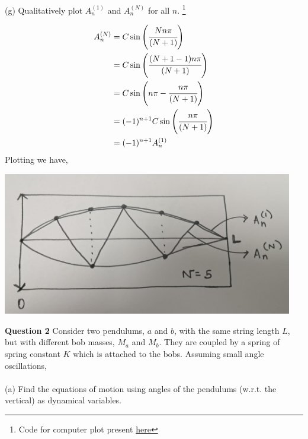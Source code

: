 \documentclass[addpoints]{exam}
\begin{document}
\begin{questions}
\begin{solution}
\end{solution}
\newpage
(g) Qualitatively plot $A^{(1)}_n$ and $A^{(N)}_n$ for all $n$.
    \footnote{Code for computer plot present \href{https://github.com/TheInvisibleFoe/IISER_notes/tree/main/PH2101/assignment02}{here}}
\begin{solution}
     \begin{align*}
         A_{n}^{(N)} &= C \sin\left(\cfrac{Nn\pi}{(N+1)}\right)\\ 
                     &= C \sin\left(\cfrac{(N+1-1)n\pi}{(N+1)}\right)\\
                     &= C \sin\left(n\pi - \cfrac{n\pi}{(N+1)}\right)\\
                     &= (-1)^{n+1}C \sin\left(\cfrac{n\pi}{(N+1)}\right)\\
                     &= (-1)^{n+1}A_n^{(1)}
    \end{align*}
    Plotting we have,
    \begin{center}
        \includegraphics[width = 5.0in]{q1g.jpeg}
    \end{center}
\end{solution}
\newpage
\question\textbf{Question 2}
Consider two pendulums, $a$ and $b$, with the same string length $L$, but with different bob masses, $M_a$ and $M_b$. They are coupled by a spring of spring constant $K$ which 
is attached to the bobs. Assuming small angle oscillations, \\ \\ 
(a) Find the equations of motion using angles of the pendulums (w.r.t. the vertical) as dynamical variables.
\begin{solution}
    \begin{center}
        


\begin{tikzpicture}[x=0.75pt,y=0.75pt,yscale=-1,xscale=1]


\end{tikzpicture}
\end{center}
\end{solution}
\end{questions}
\end{document}
